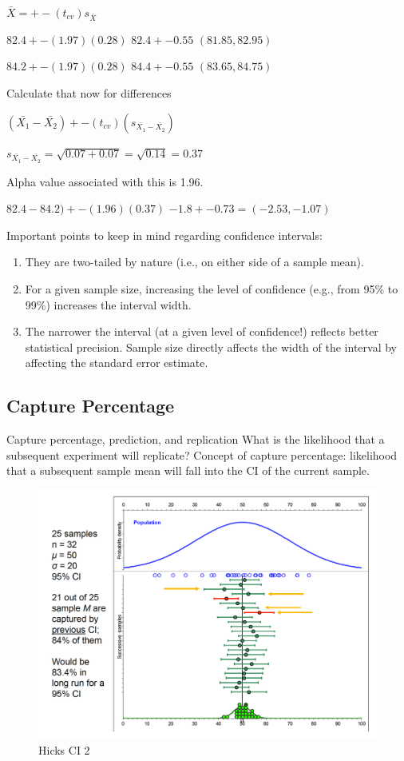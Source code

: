 \documentclass[]{book}
\providecommand{\tightlist}{%
  \setlength{\itemsep}{0pt}\setlength{\parskip}{0pt}}
\theoremstyle{definition}
\theoremstyle{definition}
\theoremstyle{definition}
\theoremstyle{remark}
\begin{document}
{\(\bar{X} = +- (t_{cv})s_{\bar{X}}\)

\(82.4 +- (1.97)(0.28)\) \(82.4 +- 0.55\) \((81.85, 82.95)\)

\(84.2 +- (1.97)(0.28)\) \(84.4 +- 0.55\) \((83.65, 84.75)\)

Calculate that now for differences

\((\bar{X_1}-\bar{X_2}) +- (t_{cv})(s_{\bar{X_1}-\bar{X_2}})\)

\(s_{\bar{X_1}-\bar{X_2}}= \sqrt{0.07 + 0.07} = \sqrt{0.14}=0.37\)

Alpha value associated with this is 1.96.

\(82.4 - 84.2) +- (1.96)(0.37)\) \(-1.8 +- 0.73 = (-2.53,-1.07)\)

Important points to keep in mind regarding confidence intervals:

\begin{enumerate}
\def\labelenumi{\arabic{enumi}.}
\tightlist
\item
  They are two-tailed by nature (i.e., on either side of a sample mean).
\item
  For a given sample size, increasing the level of confidence (e.g.,
  from 95\% to 99\%) increases the interval width.
\item
  The narrower the interval (at a given level of confidence!) reflects
  better statistical precision. Sample size directly affects the width
  of the interval by affecting the standard error estimate.
\end{enumerate}

\subsection{Capture Percentage}\label{capture-percentage}

Capture percentage, prediction, and replication What is the likelihood
that a subsequent experiment will replicate? Concept of capture
percentage: likelihood that a subsequent sample mean will fall into the
CI of the current sample.

\begin{figure}
\centering
\includegraphics{img/hicksci2.png}
\caption{Hicks CI 2}
\end{figure}

}
\end{document}
